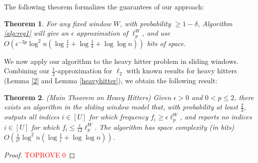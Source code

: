 \documentclass{article}
\theoremstyle{plain}
\newtheorem{theorem}{Theorem}[section]
\begin{document}
The following theorem formalizes the guarantees of our approach:

\begin{theorem}\label{1}
    For any fixed window $W$, with probability $\ge 1 - \delta$, Algorithm \ref{alg:reg1} will give an $\epsilon$ approximation of $\ell_p ^ {W}$, and  use $O(\epsilon ^ {-3p} \log ^ 2n (\log \frac 1{\epsilon} + \log \frac 1{ \delta}+  \log \log n))$ bits of space.
\end{theorem}






We now apply our algorithm to the heavy hitter problem in sliding windows. Combining our $\frac{1}{2}$-approximation for $\ell_2$ with known results for heavy hitters (Lemma \ref{2} and Lemma \ref{heavyhitter}), we obtain the following result:

\begin{theorem}\label{Heavy Hitter}
(Main Theorem on Heavy Hitters)
    Given $\epsilon>0$ and $0<p \leq 2$, there exists an algorithm in the sliding window model that, with probability at least $\frac{2}{3}$, outputs all indices $i \in[U]$ for which frequency $f_i \geq \epsilon \ell_p ^ W$, and reports no indices $i \in[U]$ for which $f_i \leq \frac{\epsilon}{12} \ell_p ^ W$. The algorithm has space complexity (in bits) $O\left(\frac{1}{\epsilon^p} \log ^2 n\left(\log \frac{1}{\epsilon}+\log \log n\right)\right)$.
\end{theorem}

\begin{proof}\textcolor{red}{TOPROVE 0}\end{proof}
\end{document}
